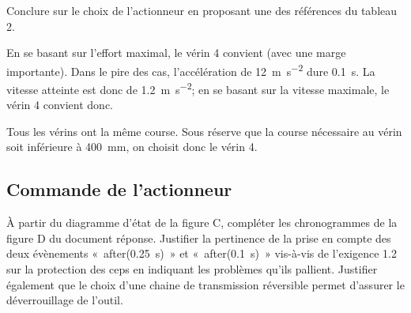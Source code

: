 \documentclass[11pt]{article}
\begin{document}
\UPSTIquestion  Conclure sur le choix de l'actionneur en proposant une des références du tableau 2.

\begin{UPSTIcorrige}
En se basant sur l'effort maximal, le vérin 4 convient (avec une marge importante).  Dans le pire des cas, l'accélération de \SI{12}{m.s^{-2}} dure \SI{0,1}{s}. La vitesse atteinte est donc de \SI{1,2}{m.s^{-2}}; en se basant sur la vitesse maximale, le vérin 4 convient donc. 

Tous les vérins ont la même course. Sous réserve que la course nécessaire au vérin soit inférieure à \SI{400}{mm}, on choisit donc le vérin 4. 
\end{UPSTIcorrige}

\subsection{Commande de l’actionneur}

\UPSTIquestion  À partir du diagramme d’état de la figure C, compléter les chronogrammes de la figure D du document réponse. Justifier la pertinence de la prise en compte des deux évènements «~after(\SI{0,25}{s})~» et «~after(\SI{0,1}{s})~» vis-à-vis de l’exigence 1.2 sur la protection des ceps en indiquant les problèmes qu’ils pallient. Justifier également que le choix d’une chaine de transmission réversible permet d’assurer le déverrouillage de l’outil.
\end{document}
